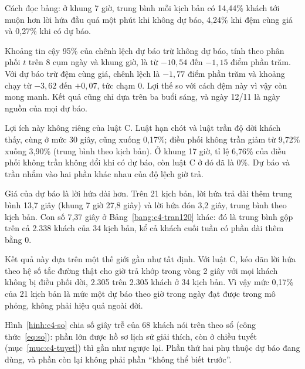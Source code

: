 Cách đọc bảng: ở khung 7 giờ, trung bình mỗi kịch bản có 14,44\% khách tới muộn hơn lời hứa đầu quá một phút khi
không dự báo, 4,24\% khi đệm cùng giá và 0,27\% khi có dự báo.

Khoảng tin cậy 95\% của chênh lệch dự báo trừ không dự báo, tính theo phân phối $t$ trên 8 cụm ngày và khung giờ, là
từ $-10{,}54$ đến $-1{,}15$ điểm phần trăm. Với dự báo trừ đệm cùng giá, chênh lệch là $-1{,}77$ điểm phần trăm và
khoảng chạy từ $-3{,}62$ đến $+0{,}07$, tức chạm 0. Lợi thế so với cách đệm này vì vậy còn mong manh. Kết quả cũng chỉ
dựa trên ba buổi sáng, và ngày 12/11 là ngày nguồn của mọi dự báo.

Lợi ích này không riêng của luật C. Luật hạn chót và luật trần độ dời khách thấy, cùng ở mức 30 giây, cũng xuống
0,17\%; điều phối không trần giảm từ 9,72\% xuống 3,90\% (trung bình theo kịch bản). Ở khung 17 giờ, tỉ lệ 6,76\% của
điều phối không trần không đổi khi có dự báo, còn luật C ở đó đã là 0\%. Dự báo và trần nhắm vào hai phần khác nhau
của độ lệch giờ trả.

Giá của dự báo là lời hứa dài hơn. Trên 21 kịch bản, lời hứa trả dài thêm trung bình 13,7 giây (khung 7 giờ 27,8
giây) và lời hứa đón 3,2 giây, trung bình theo kịch bản. Con số 7,37 giây ở Bảng~\ref{bang:c4-tran120} khác: đó là
trung bình gộp trên cả 2.338 khách của 34 kịch bản, kể cả khách cuối tuần có phần dài thêm bằng 0.

Kết quả này dựa trên một thế giới gần như tất định. Với luật C, kéo dãn lời hứa theo hệ số tắc đường thật cho giờ trả
khớp trong vòng 2 giây với mọi khách không bị điều phối dời, 2.305 trên 2.305 khách ở 34 kịch bản. Vì vậy mức 0,17\%
của 21 kịch bản là mức một dự báo theo giờ trong ngày đạt được trong mô phỏng, không phải hiệu quả ngoài đời.

Hình~\ref{hinh:c4-so} chia số giây trễ của 68 khách nói trên theo sổ (công thức~\eqref{eq:so}): phần lớn được hồ sơ
lịch sử giải thích, còn ở chiều tuyết (mục~\ref{muc:c4-tuyet}) thì gần như ngược lại. Phần thứ hai phụ thuộc dự báo
đang dùng, và phần còn lại không phải phần ``không thể biết trước''.


